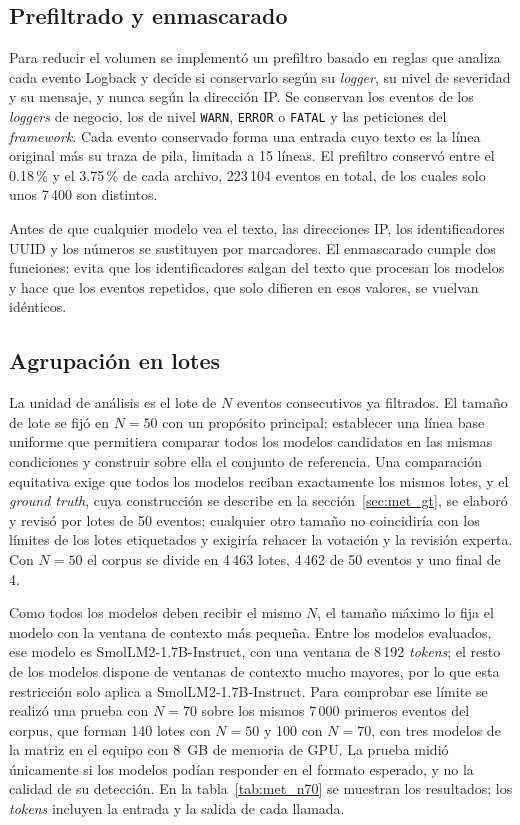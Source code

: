 \subsection{Prefiltrado y enmascarado}\label{subsec:met_prefiltro}

Para reducir el volumen se implementó un prefiltro basado en reglas que analiza cada evento Logback y decide si conservarlo según su \textit{logger}, su nivel de severidad y su mensaje, y nunca según la dirección IP. Se conservan los eventos de los \textit{loggers} de negocio, los de nivel \texttt{WARN}, \texttt{ERROR} o \texttt{FATAL} y las peticiones del \textit{framework}. Cada evento conservado forma una entrada cuyo texto es la línea original más su traza de pila, limitada a 15 líneas. El prefiltro conservó entre el 0.18\,\% y el 3.75\,\% de cada archivo, 223\,104 eventos en total, de los cuales solo unos 7\,400 son distintos.

Antes de que cualquier modelo vea el texto, las direcciones IP, los identificadores UUID y los números se sustituyen por marcadores. El enmascarado cumple dos funciones: evita que los identificadores salgan del texto que procesan los modelos y hace que los eventos repetidos, que solo difieren en esos valores, se vuelvan idénticos.

\subsection{Agrupación en lotes}\label{subsec:met_batches}

La unidad de análisis es el lote de $N$ eventos consecutivos ya filtrados. El tamaño de lote se fijó en $N = 50$ con un propósito principal: establecer una línea base uniforme que permitiera comparar todos los modelos candidatos en las mismas condiciones y construir sobre ella el conjunto de referencia. Una comparación equitativa exige que todos los modelos reciban exactamente los mismos lotes, y el \textit{ground truth}, cuya construcción se describe en la sección~\ref{sec:met_gt}, se elaboró y revisó por lotes de 50 eventos; cualquier otro tamaño no coincidiría con los límites de los lotes etiquetados y exigiría rehacer la votación y la revisión experta. Con $N = 50$ el corpus se divide en 4\,463 lotes, 4\,462 de 50 eventos y uno final de 4.

Como todos los modelos deben recibir el mismo $N$, el tamaño máximo lo fija el modelo con la ventana de contexto más pequeña. Entre los modelos evaluados, ese modelo es SmolLM2-1.7B-Instruct, con una ventana de 8\,192 \textit{tokens}; el resto de los modelos dispone de ventanas de contexto mucho mayores, por lo que esta restricción solo aplica a SmolLM2-1.7B-Instruct. Para comprobar ese límite se realizó una prueba con $N = 70$ sobre los mismos 7\,000 primeros eventos del corpus, que forman 140 lotes con $N = 50$ y 100 con $N = 70$, con tres modelos de la matriz en el equipo con 8~GB de memoria de GPU. La prueba midió únicamente si los modelos podían responder en el formato esperado, y no la calidad de su detección. En la tabla~\ref{tab:met_n70} se muestran los resultados; los \textit{tokens} incluyen la entrada y la salida de cada llamada.

